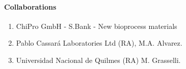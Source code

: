 


\paragraph{Collaborations}
\begin{enumerate}
\item ChiPro GmbH - S.Bank - New bioprocess materials \item Pablo
Cassar\'{a} Laboratories Ltd (RA), M.A. Alvarez. \item Universidad
Nacional de Quilmes (RA) M. Grasselli.

\end{enumerate}


\nocite{Fernandez-Lahore1,Fernandez-Lahore2,Fernandez-Lahore3,Fernandez-Lahore4,Fernandez-Lahore5,Fernandez-Lahore6,Fernandez-Lahore7}
